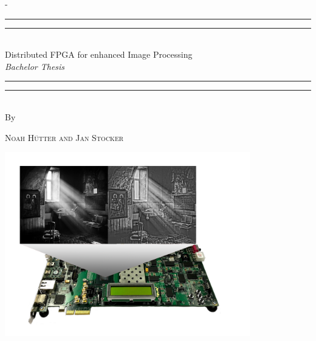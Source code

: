 \begin{titlingpage}
\begin{SingleSpace}
\calccentering{\unitlength} 
\begin{adjustwidth*}{\unitlength}{-\unitlength}
\vspace*{0mm}
\begin{center}
\rule[0.5ex]{\linewidth}{2pt}\vspace*{-\baselineskip}\vspace*{3.2pt}
\rule[0.5ex]{\linewidth}{1pt}\\[\baselineskip]

{\HUGE Distributed FPGA for enhanced Image Processing }\\[4mm]
{\Large \textit{Bachelor Thesis}}\\

\rule[0.5ex]{\linewidth}{1pt}\vspace*{-\baselineskip}\vspace{3.2pt}
\rule[0.5ex]{\linewidth}{2pt}\\
\vspace{2mm}
{\large By}\\
\vspace{2mm}

{\large\textsc{Noah H\"utter and Jan Stocker}}\\

\vspace{11mm}

\includegraphics[width=0.8\textwidth]{images/titlepage/p6_titlepage.png}\\

\vspace{2mm}


\end{center}
\end{adjustwidth*}
\end{SingleSpace}
\end{titlingpage}

